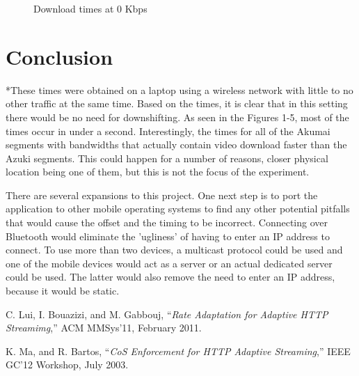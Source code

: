 \documentclass[10pt]{IEEEtran} %
\begin{document}
\begin{figure}
{}
\caption{Download times at 0 Kbps}
\label{fig:graph0}
\end{figure}

\section{Conclusion}

*These times were obtained on a laptop using a wireless network with little to 
no other traffic at the same time. Based on the times, it is clear that in this
setting there would be no need for downshifting. As seen in the Figures 1-5,
most of the times occur in under a second. Interestingly, the times for all of 
the Akumai segments with bandwidths that actually contain video download faster 
than the Azuki segments. This could happen for a number of reasons, closer 
physical location being one of them, but this is not the focus of the 
experiment.

There are several expansions to this project. One next step is to port the 
application to other mobile operating systems to find any other potential 
pitfalls that would cause the offset and the timing to be incorrect. Connecting
over Bluetooth would eliminate the 'ugliness' of having to enter an IP address
to connect. To use more than two devices, a multicast protocol could be used and
one of the mobile devices would act as a server or an actual dedicated server
could be used. The latter would also remove the need to enter an IP address,
because it would be static. 

\begin{thebibliography}{1}

C. Lui, I. Bouazizi, and M. Gabbouj, ``\emph{Rate Adaptation for Adaptive HTTP
Streamimg},'' ACM MMSys'11, February 2011.

K. Ma, and R. Bartos, ``\emph{CoS Enforcement for HTTP Adaptive Streaming},'' 
IEEE GC'12 Workshop, July 2003.

\end{thebibliography}
\end{document}
